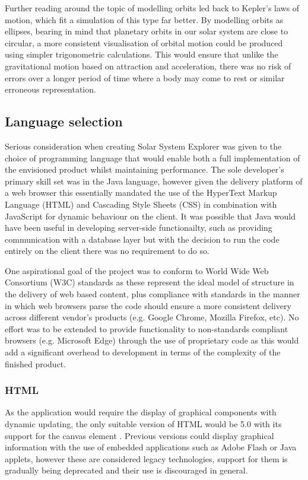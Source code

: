 \documentclass[twoside]{bhamthesis}
\begin{document}
Further reading around the topic of modelling orbits \cite{dvorak_chaos_2005}  led back to Kepler's laws of motion, which fit a simulation of this type far better. By modelling orbits as ellipses, bearing in mind that planetary orbits in our solar system are close to circular, a more consistent visualisation of orbital motion could be produced using simpler trigonometric calculations. This would ensure that unlike the gravitational motion based on attraction and acceleration, there was no risk of errors over a longer period of time where a body may come to rest or similar erroneous representation.



\subsection{Language selection}

Serious consideration when creating Solar System Explorer was given to the choice of programming language that would enable both a full implementation of the envisioned product whilst maintaining performance. The sole developer's primary skill set was in the Java language, however given the delivery platform of a web browser this essentially mandated the use of the HyperText Markup Language (HTML) and Cascading Style Sheets (CSS) in combination with JavaScript for dynamic behaviour on the client. It was possible that Java would have been useful in developing server-side functionailty, such as providing communication with a database layer but with the decision to run the code entirely on the client there was no requirement to do so.

One aspirational goal of the project was to conform to World Wide Web Consortium (W3C) standards as these represent the ideal model of structure in the delivery of web based content, plus compliance with standards in the manner in which web browsers parse the code should ensure a more consistent delivery across different vendor's products (e.g. Google Chrome, Mozilla Firefox, etc). No effort was to be extended to provide functionality to non-standards compliant browsers (e.g. Microsoft Edge) through the use of proprietary code as this would add a significant overhead to development in terms of the complexity of the finished product.


\subsubsection{HTML}
As the application would require the display of graphical components with dynamic updating, the only suitable version of HTML would be 5.0 with its support for the canvas element \cite{the_world_wide_web_consortium_w3c_html5_2014}. Previous versions could display graphical information with the use of embedded applications such as Adobe Flash or Java applets, however these are considered legacy technologies, support for them is gradually being deprecated \cite{adobe_corporate_communications_flash_2017} and their use is discouraged in general.
\end{document}
